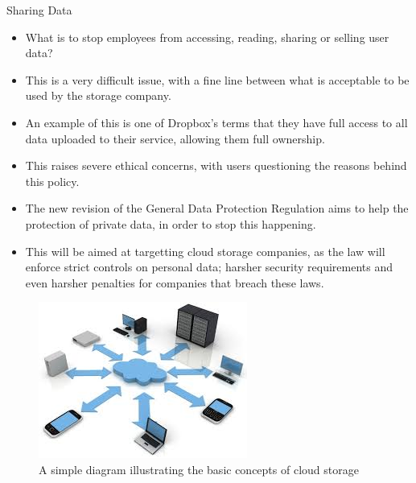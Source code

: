 \documentclass[final]{beamer}
\newlength{\onecolwid}
\newlength{\twocolwid}
\begin{document}
\begin{frame}[t]
\begin{columns}[t]
\begin{column}{\twocolwid}
\begin{columns}[t,totalwidth=\twocolwid]
\begin{column}{\onecolwid}
\begin{block}{Sharing Data}
\begin{itemize}
\item What is to stop employees from accessing, reading, sharing or selling user data?
\item This is a very difficult issue, with a fine line between what is acceptable to be used by the storage company.
\item An example of this is one of Dropbox's terms that they have full access to all data uploaded to their service, allowing them full ownership\cite{onwubiko}.
\item This raises severe ethical concerns, with users questioning the reasons behind this policy.
\item The new revision of the General Data Protection Regulation aims to help the protection of private data, in order to stop this happening. 
\item This will be aimed at targetting cloud storage companies, as the law will enforce strict controls on personal data; harsher security requirements and even harsher penalties for companies that breach these laws. 
\end{itemize}
\end{block}

\begin{figure}
\includegraphics[width=0.8\linewidth]{storage.jpeg}
\caption{A simple diagram illustrating the basic concepts of cloud storage}
\end{figure}


\end{column} %


\end{columns}
\end{column}
\end{columns}
\end{frame}
\end{document}
